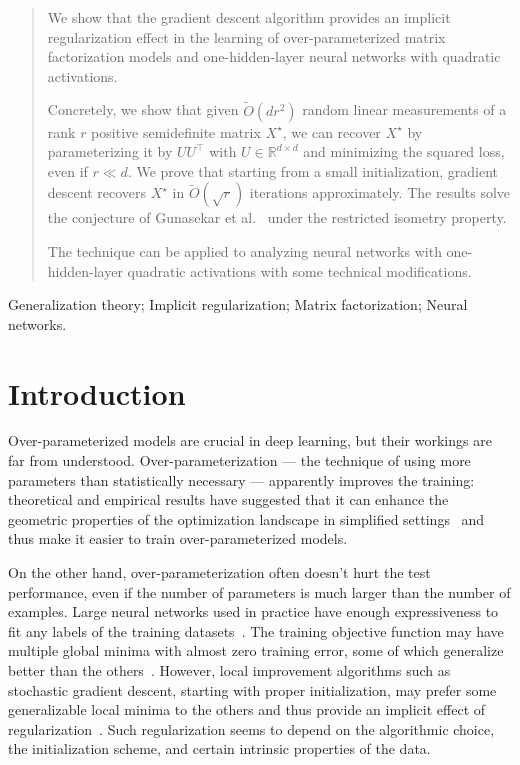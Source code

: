 \begin{abstract}
    We show that the gradient descent algorithm provides an implicit regularization effect in the learning of over-parameterized matrix factorization models and one-hidden-layer neural networks with quadratic activations. 
    
Concretely, we show that given $\tilde{O}(dr^{2})$ random linear measurements of a rank $r$ positive semidefinite matrix $X^{\star}$, we can recover $X^{\star}$ by parameterizing it by $UU^\top$ with $U\in \mathbb R^{d\times d}$ and minimizing the squared loss, even if $r \ll d$. We prove that starting from a small initialization, gradient descent recovers $X^{\star}$ in $\tilde{O}(\sqrt{r})$ iterations approximately. The results solve the conjecture of Gunasekar et al.~\cite{gunasekar2017implicit} under the restricted isometry property. 
    
The technique can be applied to analyzing neural networks with one-hidden-layer quadratic activations with some technical modifications. 
\end{abstract}

\begin{keywords}
Generalization theory; Implicit regularization; Matrix factorization; Neural networks.
\end{keywords}


\section{Introduction}

Over-parameterized models are crucial in deep learning, but their workings are far from understood. Over-parameterization --- the technique of using more parameters than statistically necessary --- apparently improves the training: theoretical and empirical results have suggested that it can enhance the geometric properties of the optimization landscape in simplified settings~\cite{livni2014computational,hardt2016gradient,hardt17identity,soudry2016no} and thus make it easier to train over-parameterized models.

On the other hand,  over-parameterization often doesn't hurt the test performance, even if the number of parameters is much larger than the number of examples. Large neural networks used in practice have enough expressiveness to fit any labels of the training datasets~\cite{zhang2016understanding,hardt17identity}. The training objective function may have multiple global minima with almost zero training error, some of which generalize better than the others~\cite{keskar2016large,dinh2017sharp}. However, local improvement algorithms such as stochastic gradient descent, starting with proper initialization, may prefer some generalizable local minima to the others and thus provide an implicit effect of regularization~\cite{srebro2011universality,neyshabur2014search,hardt2015train,neyshabur2017exploring,wilson2017marginal}. 
Such regularization seems to depend on the algorithmic choice, the initialization scheme, and certain intrinsic properties of the data.

